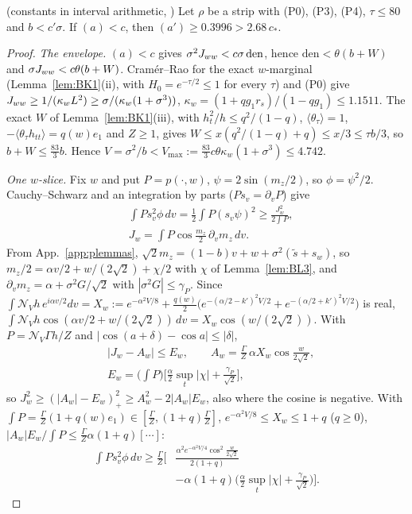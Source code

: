 \begin{lemma} \proofst{} (constants in interval arithmetic, )
\label{lem:E3}
Let $\rho$ be a strip with (P0), (P3), (P4), $\tau\le80$ and $b<c'\sigma$. If $(a)<c$, then $(a')\ge0.3996>2.68\,c_*$.
\end{lemma}
\begin{proof}
\emph{The envelope.} $(a)<c$ gives $\sigma^2J_{ww}<c\sigma\,\mathrm{den}$, hence $\mathrm{den}<\theta(b+W)$ and $\sigma J_{ww}<c\theta(b+W)$. Cram\'er--Rao for the exact
$w$-marginal (Lemma~\ref{lem:BK1}(ii), with $H_0=e^{-\tau/2}\le1$ for every $\tau$) and (P0) give $J_{ww}\ge1/(\kappa_wL^2)\ge\sigma/(\kappa_w(1+\sigma^3))$,
$\kappa_w=(1+qg_1r_s)/(1-qg_1)\le1.1511$. The exact $W$ of Lemma~\ref{lem:BK1}(iii), with $h_t^2/h\le q^2/(1-q)$, $\langle\theta_\tau\rangle=1$,
$-\langle\theta_\tau h_{tt}\rangle=q(w)e_1$ and $Z\ge1$, gives $W\le x(q^2/(1-q)+q)\le x/3\le\tau b/3$, so $b+W\le\frac{83}3b$. Hence
$V=\sigma^2/b<V_{\max}:=\frac{83}3c\theta\kappa_w(1+\sigma^3)\le4.742$.

\emph{One $w$-slice.} Fix $w$ and put $P=p(\cdot,w)$, $\psi=2\sin(m_z/2)$, so $\phi=\psi^2/2$. Cauchy--Schwarz and an integration by parts ($Ps_v=\partial_vP$) give
\begin{equation*}
\begin{aligned}
&\int Ps_v^2\phi\,dv=\tfrac12\int P(s_v\psi)^2\ge\frac{J_w^2}{2\int P},\\
&J_w=\int P\cos\tfrac{m_z}2\,\partial_vm_z\,dv .
\end{aligned}
\end{equation*}
From App.~\ref{app:plemmas}, $\sqrt2m_z=(1-b)v+w+\sigma^2(\tilde s+s_w)$, so $m_z/2=\alpha v/2+w/(2\sqrt2)+\chi/2$ with $\chi$ of Lemma~\ref{lem:BL3}, and
$\partial_vm_z=\alpha+\sigma^2G/\sqrt2$ with $|\sigma^2G|\le\gamma_P$. Since $\int\mathcal N_Vh\,e^{i\alpha v/2}dv=X_w:=e^{-\alpha^2V/8}+\frac{q(w)}2\big(e^{-(\alpha/2-k')^2V/2}+e^{-(\alpha/2+k')^2V/2}\big)$ is real,
$\int\mathcal N_Vh\cos(\alpha v/2+w/(2\sqrt2))\,dv=X_w\cos(w/(2\sqrt2))$. With $P=\mathcal N_V\Gamma h/Z$ and $|\cos(a+\delta)-\cos a|\le|\delta|$,
\begin{equation*}
\begin{aligned}
&|J_w-A_w|\le E_w,\qquad A_w=\tfrac\Gamma Z\,\alpha X_w\cos\tfrac w{2\sqrt2},\\
&E_w=\Big(\int P\Big)\Big[\tfrac\alpha2\sup_t|\chi|+\tfrac{\gamma_P}{\sqrt2}\Big],
\end{aligned}
\end{equation*}
so $J_w^2\ge(|A_w|-E_w)_+^2\ge A_w^2-2|A_w|E_w$, also where the cosine is negative. With $\int P=\frac\Gamma Z(1+q(w)e_1)\in[\frac\Gamma Z,(1+q)\frac\Gamma Z]$,
$e^{-\alpha^2V/8}\le X_w\le1+q$ ($q\ge0$), $|A_w|E_w/\int P\le\frac\Gamma Z\alpha(1+q)[\cdots]$:
\begin{equation*}
\begin{aligned}
\int Ps_v^2\phi\,dv\ge\frac\Gamma Z\Big[&\frac{\alpha^2e^{-\alpha^2V/4}\cos^2\frac w{2\sqrt2}}{2(1+q)}\\
&-\alpha(1+q)\Big(\frac\alpha2\sup_t|\chi|+\frac{\gamma_P}{\sqrt2}\Big)\Big].
\end{aligned}
\end{equation*}


\end{proof}
